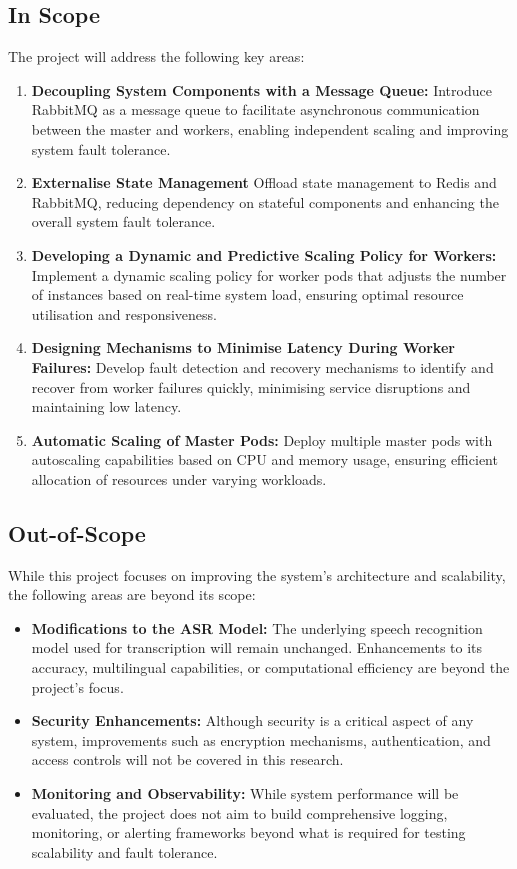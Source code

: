\subsection{In Scope}
The project will address the following key areas:
\begin{enumerate}
    \item \textbf{Decoupling System Components with a Message Queue:} Introduce RabbitMQ as a message queue to facilitate asynchronous communication between the master and workers, enabling independent scaling and improving system fault tolerance.
    \item \textbf{Externalise State Management} Offload state management to Redis and RabbitMQ, reducing dependency on stateful components and enhancing the overall system fault tolerance.
    \item \textbf{Developing a Dynamic and Predictive Scaling Policy for Workers:} Implement a dynamic scaling policy for worker pods that adjusts the number of instances based on real-time system load, ensuring optimal resource utilisation and responsiveness.
    \item \textbf{Designing Mechanisms to Minimise Latency During Worker Failures:} Develop fault detection and recovery mechanisms to identify and recover from worker failures quickly, minimising service disruptions and maintaining low latency.
    \item \textbf{Automatic Scaling of Master Pods:} Deploy multiple master pods with autoscaling capabilities based on CPU and memory usage, ensuring efficient allocation of resources under varying workloads.
\end{enumerate}

\subsection{Out-of-Scope}
While this project focuses on improving the system's architecture and scalability, the following areas are beyond its scope:
\begin{itemize}
    \item \textbf{Modifications to the ASR Model:} The underlying speech recognition model used for transcription will remain unchanged. Enhancements to its accuracy, multilingual capabilities, or computational efficiency are beyond the project's focus.
    \item \textbf{Security Enhancements:} Although security is a critical aspect of any system, improvements such as encryption mechanisms, authentication, and access controls will not be covered in this research.
    \item \textbf{Monitoring and Observability:} While system performance will be evaluated, the project does not aim to build comprehensive logging, monitoring, or alerting frameworks beyond what is required for testing scalability and fault tolerance.
\end{itemize}


